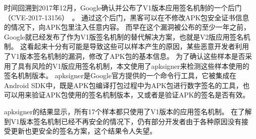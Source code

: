时间回溯到2017年12月，Google确认并公布了V1版本应用签名机制的一个后门（CVE-2017-13156）~\cite{android_security_bulletin}。
通过这个后门，黑客可以在不修改APK包安全证书信息的情况下，向APK包里注入任意内容。
而早在这个漏洞被公布的至少一年之前，Google就已经发布了作为V1版签名机制的替代解决方案，也就是V2版应用签名机制。
这看起来十分有可能是导致这些可以样本产生的原因，某些恶意开发者利用了V1版本签名机制的漏洞，修改了APK包的基本信息。
为了确认这些样本是否采用了具有风险的V1版应用签名机制，本文使用了apksigner来检测这些样本使用的签名机制版本。
apksigner是Google官方提供的一个命令行工具，它被集成在Android SDK中，既是APK包编译打包过程中为APK包进行数字签名的工具，也可以用来验证APK包使用的签名机制版本，又或者是验证APK的签名是否有效。

apksigner的结果显示，所有17个样本都只使用了V1版本的应用签名机制。
在了解到V1版本签名机制已经不再安全的情况下，仍有部分开发者由于各种原因没有接受更新也更安全的签名方案，这个结果令人失望。

\vspace{5mm}
\noindent{}



